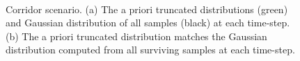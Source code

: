 \documentclass[letterpaper]{article}
\begin{document}
\begin{figure}[h]
\begin{center}
\\
\vspace{-20pt}
\end{center}
\caption{ Corridor scenario. (a) The a priori truncated distributions (green) and Gaussian distribution of all samples (black) at each time-step. (b) The a priori truncated distribution matches the Gaussian distribution computed from all surviving samples at each time-step.}
\label{fig:panel3}
\end{figure}
\end{document}
